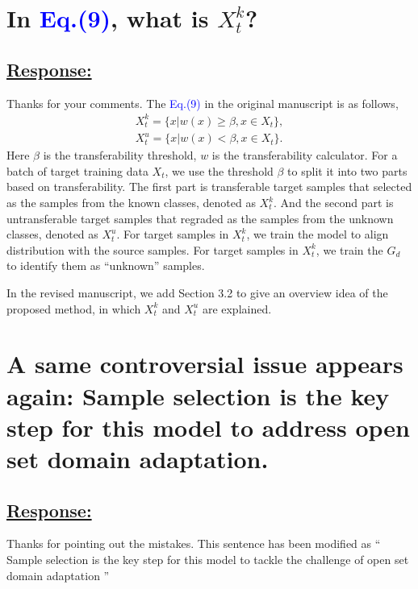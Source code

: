\section{
    In \textcolor{blue}{Eq.(9)}, what is  $X_t^k$?
}

\subsection*{\underline{\textbf{Response:}}}

Thanks for your comments.
The \textcolor{blue}{Eq.(9)} in the original manuscript is as follows, 
\begin{equation}
    \label{eq: split target examples}
    \begin{split}
        X_t^k=\{x|w(x) \geq \beta, x \in X_t \}, \\
        X_t^u=\{x|w(x) < \beta, x \in X_t \}.
    \end{split}
\end{equation}
Here $\beta$ is the transferability threshold, $w$ is the transferability calculator.
For a batch of target training data $X_t$, we use the threshold $\beta$ to split it into two parts based on transferability.
The first part is transferable target samples that selected as the samples from the known classes, denoted as $X_t^k$.
And the second part is untransferable target samples that regraded as the samples from the unknown classes, denoted as $X_t^u$.
For target samples in $X_t^k$, we train the model to align distribution with the source samples. 
For target samples in $X_t^k$, we train the $G_d$ to identify them as ``unknown'' samples. 

In the revised manuscript, we add Section 3.2 to give an overview idea of the proposed method, in which $X_t^k$ and $X_t^u$ are explained. 

\section{
    A same controversial issue appears again: Sample selection is the key step for this model to address open set domain adaptation. 
}

\subsection*{\underline{\textbf{Response:}}}

Thanks for pointing out the mistakes.
This sentence has been modified as `` Sample selection is the key step for this model to tackle the challenge of open set domain adaptation '' 

